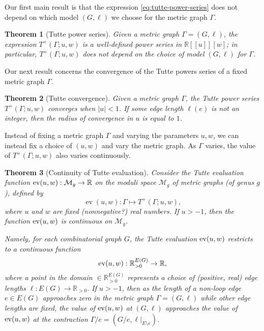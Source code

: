\documentclass{amsart}
\newtheorem{thm}{Theorem}
\theoremstyle{definition}
\newcommand{\RR}{\mathbb{R}}
\DeclareMathOperator{\ev}{ev}
\begin{document}
Our first main result is that the expression \eqref{eq:tutte-power-series} does not depend on which  model $(G,\ell)$ we choose for the metric graph $\Gamma$.
\begin{thm}[Tutte power series]
Given a metric graph $\Gamma = (G,\ell)$,
the expression $T^+(\Gamma; u,w)$
is a well-defined power series in
$\RR[[u]][w]$;
in particular,
$T^+(\Gamma; u,w)$ does not depend on the choice of model $(G,\ell)$ for $\Gamma$.
\end{thm}

Our next result concerns the convergence of the Tutte powers series of a fixed metric graph $\Gamma$.
\begin{thm}[Tutte convergence]
Given a metric graph $\Gamma$,
the Tutte power series $T^+(\Gamma;u,w)$ converges when $|u|<1$.
If some edge length $\ell(e)$ is not an integer,
then the radius of convergence in $u$ is equal to $1$.
\end{thm}

Instead of fixing a metric graph $\Gamma$ and varying the parameters $u,w$,
we can instead fix a choice of $(u,w)$ and vary the metric graph.
As $\Gamma$ varies, the value of $T^+(\Gamma;u,w)$ also varies continuously.
\begin{thm}[Continuity of Tutte evaluation]
Consider the Tutte evaluation function %
${\rm ev}(u,w) : \mathcal M_g \to \RR$ 
on the moduli space 
$\mathcal M_g$ of metric graphs (of genus $g$),
defined by
$$ \ev(u,w) : \Gamma \mapsto T^+(\Gamma; u,w) ,$$
where  $u$ and $w$ are fixed (nonnegative?) real numbers.
If $u > -1$, 
then the function ${\rm ev}(u,w)$ is continuous on $\mathcal M_g$.

Namely, for each combinatorial graph $G$,
the Tutte evaluation 
${\rm ev}(u,w) $ 
restricts to a continuous function
$$ {\rm ev}(u,w) : \RR_{>0}^{E(G)} \to \RR,$$ 
where a point in the domain $ \in \RR_{>0}^{E(G)}$
represents a choice of (positive, real) edge lengths  $\ell : E(G) \to \RR_{>0}$.
If $u > -1$, then as the length of a  non-loop edge $e \in E(G)$ approaches zero
in the metric graph $\Gamma = (G,\ell)$
while other edge lengths are fixed,
the value of 
${\rm ev}(u,w)$
at $(G,\ell)$ %
approaches the value of ${\rm ev}(u,w)$ at the contraction 
$\Gamma / e = (G / e, \ell \big|_{E\setminus e})$.
\end{thm}
\end{document}
